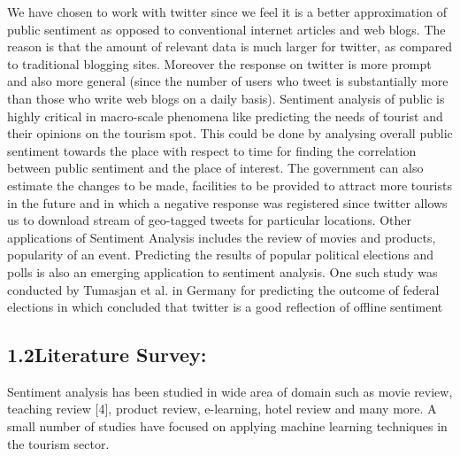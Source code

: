 \documentclass[12pt]{article}
\begin{document}
\begin{justify}
We have chosen to work with twitter since we feel it is a better approximation of public sentiment as opposed to conventional internet articles and web blogs. The reason is that the amount of relevant data is much larger for twitter, as compared to traditional blogging sites. Moreover the response on twitter is more prompt and also more general (since the number of users who tweet is substantially more than those who write web blogs on a daily basis). Sentiment analysis of public is highly critical in macro-scale phenomena like predicting the needs of tourist and their opinions on the tourism spot. This could be done by analysing overall public sentiment towards the place with respect to time for finding the correlation between public sentiment and the place of interest. The government can also estimate the changes to be made, facilities to be provided to attract more tourists in the future and in which a negative response was registered since twitter allows us to download stream of geo-tagged tweets for particular locations. Other applications of Sentiment Analysis includes the review of movies and products, popularity of an event. Predicting the results of popular political elections and polls is also an emerging application to sentiment analysis. One such study was conducted by Tumasjan et al. in Germany for predicting the outcome of federal elections in which concluded that twitter is a good reflection of offline sentiment 
\end{justify}\par


\vspace{\baselineskip}

\newpage

\vspace{\baselineskip}

\vspace{\baselineskip}

\vspace{\baselineskip}

\vspace{\baselineskip}

\vspace{\baselineskip}
\subsection*{1.2\hspace*{10pt}Literature Survey:}
\begin{justify}
Sentiment analysis has been studied in wide area of domain such as movie review, teaching review [4], product review, e-learning, hotel review and many more. A small number of studies have focused on applying machine learning techniques in the tourism sector. 
\end{justify}\par
\end{document}
